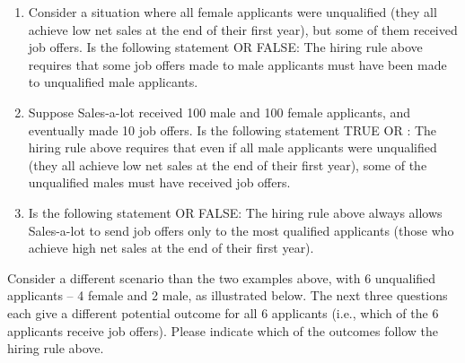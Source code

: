 \documentclass{article}
\newcommand{\correct}[1]{{\color{red}{#1}}}
\newcommand{\correct}[1]{{\color{red}{#1}}}
\begin{document}
\begin{enumerate}
\item Consider a situation where all female applicants were unqualified (they all achieve low net sales at the end of their first year), but some of them received job offers. Is the following statement \correct{TRUE} OR FALSE: The hiring rule above requires that some job offers made to male applicants must have been made to unqualified male applicants.

\item Suppose Sales-a-lot received 100 male and 100 female applicants, and eventually made 10 job offers. Is the following statement TRUE OR \correct{FALSE}: The hiring rule above requires that even if all male applicants were unqualified (they all achieve low net sales at the end of their first year), some of the unqualified males must have received job offers.

\item Is the following statement \correct{TRUE} OR FALSE: The hiring rule above always allows Sales-a-lot to send job offers only to the most qualified applicants (those who achieve high net sales at the end of their first year).

\end{enumerate}

Consider a different scenario than the two examples above, with 6 unqualified applicants -- 4 female and 2 male, as illustrated below. The next three questions each give a different potential outcome for all 6 applicants (i.e., which of the 6 applicants receive job offers). Please indicate which of the outcomes follow the hiring rule above.
\end{document}

